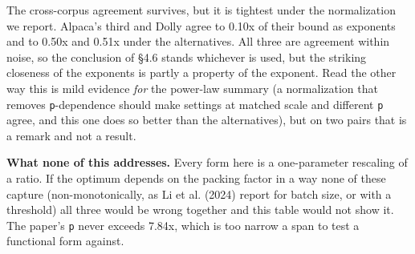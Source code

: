 \documentclass[11pt]{article}
\begin{document}
The cross-corpus agreement survives, but it is tightest under the normalization we report. Alpaca's third and Dolly agree to 0.10x of their bound as exponents and to 0.50x and 0.51x under the alternatives. All three are agreement within noise, so the conclusion of \S{}4.6 stands whichever is used, but the striking closeness of the exponents is partly a property of the exponent. Read the other way this is mild evidence \emph{for} the power-law summary (a normalization that removes \texttt{p}-dependence should make settings at matched scale and different \texttt{p} agree, and this one does so better than the alternatives), but on two pairs that is a remark and not a result.

\textbf{What none of this addresses.} Every form here is a one-parameter rescaling of a ratio. If the optimum depends on the packing factor in a way none of these capture (non-monotonically, as Li et al. (2024) report for batch size, or with a threshold) all three would be wrong together and this table would not show it. The paper's \texttt{p} never exceeds 7.84x, which is too narrow a span to test a functional form against.
\end{document}
